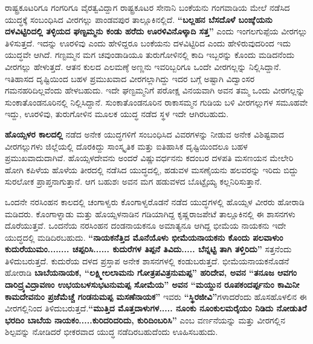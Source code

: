 ರಾಷ್ಟ್ರಕೂಟರಿಗೂ ಗಂಗರಿಗೂ ವೈರತ್ವವಿದ್ದಾಗ ರಾಷ್ಟ್ರಕೂಟರ ಸೇನಾನಿ ಬಂಕೆಯನು ಗಂಗವಾಡಿಯ ಮೇಲೆ ನಡೆಸಿದ ಯುದ್ಧಕ್ಕೆ ಸಂಬಂಧಿಸಿದ ವೀರಗಲ್ಲು ಪಾಂಡವಪುರ ತಾಲ್ಲೂಕಿನಲ್ಲಿದೆ. \textbf{“ಬಲ್ಲಹನ ಬೆಸದೊಳೆ ಬಂಙ್ಕೆಯನು ದಳವಿಟ್ಟಿರಿದಲ್ಲಿ ತಳ್ಳಿಯದ ಘಣ್ಟಮ್ಮನು ಕಂಡು ಹರೆದು ಊರಳಿವಿನೊಳ್ಕಾದಿ ಸತ್ತ”} ಎಂದು ಇಂಗಲಗುಪ್ಪೆಯ ವೀರಗಲ್ಲು ತಿಳಿಸುತ್ತದೆ. ಇದನ್ನು ಊರಳಿವು ಎಂದು ಹೇಳಿದ್ದರೂ ಬಂಕೆಯನು ದಳವಿಟ್ಟಿರಿದ ಎಂದು ಹೇಳಿರುವುದರಿಂದ ಇದು ಯುದ್ಧವೇ ಆಗಿದೆ. ಗಣ್ಟಮ್ಮನ ಮಗ ಚವುಂಡಾಡಿಯೂ ತುರುಗೋಳಿನಲ್ಲಿ ಕಾದಿ ಇಬ್ಬರನ್ನು ಕೊಂದು ಮಡಿದನೆಂದು ವೀರಗಲ್ಲು ಹೇಳುತ್ತದೆ. ಆತನ ಕುಲದ ಎಲಮಣ್ಠೆ ಅಣ್ಣನು ಇವರಿಬ್ಬರಿಗೂ ಒಂದೇ ವೀರಗಲ್ಲನ್ನು ನಿಲ್ಲಿಸಿದ್ದಾನೆ. ಇತಿಹಾಸದ ದೃಷ್ಟಿಯಿಂದ ಬಹಳ ಪ್ರಮುಖವಾದ ವೀರಗಲ್ಲಾಗಿದ್ದು ಇದರ ಬಗ್ಗೆ ಅಷ್ಟಾಗಿ ವಿದ್ವಾಂಸರ ಗಮನಹರಿದಿಲ್ಲವೆಂದು ಹೇಳಬಹುದು. ಇದೇ ಘಣ್ಟಮ್ಮನಿಗೆ ಪರೋಕ್ಷ ವಿನಯವಾಗಿ ಅವನ ತಮ್ಮ ಒಂದು ವೀರಗಲ್ಲನ್ನು ಸುಂಕಾತೊಂಡನೂರಿನಲ್ಲಿ ನಿಲ್ಲಿಸಿದ್ದಾನೆ. ಸುಂಕಾತೊಂಡನೂರಿನ ರಾಕಾಸಮ್ಮನ ಗುಡಿಯ ಬಳಿ ವೀರಗಲ್ಲುಗಳ ಸಮೂಹವೇ ಇದ್ದು, ಊರಳಿವು, ತುರುಗೋಳಿನ ಮೂಲಕ ಯುದ್ಧ ನಡೆದ ಸ್ಥಳ ಇದೇ ಆಗಿರಬಹುದು.

\textbf{ಹೊಯ್ಸಳರ ಕಾಲದಲ್ಲಿ} ನಡೆದ ಅನೇಕ ಯುದ್ಧಗಳಿಗೆ ಸಂಬಂಧಿಸಿದ ವಿವರಗಳನ್ನು ನೀಡುವ ಅನೇಕ ವಿಶಿಷ್ಟವಾದ ವೀರಗಲ್ಲುಗಳು ಜಿಲ್ಲೆಯಲ್ಲಿ ದೊರಕಿದ್ದು ಸಾಂಸ್ಕೃತಿಕ ಮತ್ತು ಐತಿಹಾಸಿಕ ದೃಷ್ಟಿಯಿಂದಲೂ ಬಹಳ ಪ್ರಮುಖವಾದುದಾಗಿವೆ. ಹೊಯ್ಸಳದೇವನು ಅಂದರೆ ವಿಷ್ಣುವರ್ಧನನು ಕದಂಬರ ದಳಪತಿ ಮಸಣಯನ ಮೇಲೇರಿ ಹೋಗಿ ಕಪಿಳೆಯ ಹೊಳೆಯ ತೀರದಲ್ಲಿ ನಡೆಸಿದ ಯುದ್ಧದಲ್ಲಿ, ಹಡುವಳ ಮಸಣೈಯನು ಹಲವರನ್ನು ಇರಿದು ಬಿದ್ದು ಸುರಲೋಕ ಪ್ರಾಪ್ತನಾಗುತ್ತಾನೆ. ಆಗ ಬಹುಶಃ ಅವನ ಮಗ ಹಡುವಳದ ಬೊಟ್ಟೈಯ್ಯ ಕಲ್ಲನಿರಿಸುತ್ತಾನೆ.

ಒಂದನೇ ನರಸಿಂಹನ ಕಾಲದಲ್ಲಿ ಚಂಗಾಳ್ವರು ಕೊಂಗಾಳ್ವರೊಡನೆ ನಡೆದ ಯುದ್ಧಗಳಲ್ಲಿ ಹೊಯ್ಸಳ ವೀರರು ಹೋರಾಡಿ ಮಡಿದರು. ಕೊಂಗಾಳ್ನಾಡು ಮತ್ತು ಹೊಯ್ಸಳನಾಡಿನ ಗಡಿಯಾಗಿದ್ದ ಕೃಷ್ಣರಾಜಪೇಟೆ ತಾಲ್ಲೂಕಿನಲ್ಲಿ ಈ ಶಾಸನಗಳು ದೊರೆಯುತ್ತವೆ. ಒಂದನೆಯ ನರಸಿಂಹನ ದಂಡನಾಯಕನೂ ಅಮಾತ್ಯನೂ ಆಗಿದ್ದ ಭೀಮೆಯ ನಾಯಕನು ಇದೇ ಯುದ್ಧದಲ್ಲಿ ಮಡಿದಿರಬಹುದು. \textbf{“ನಾಯಕನೆತ್ತಿದ ಮೊನೆಯೊಳು ಭೀಮೆಯನಾಯಕನು ಕೊಂದು ಪಲವಾಳುಂ ಕುದುರೆಯುಮಂ........ ಚಪ್ಪರಿಸಿ...... ಕುದುರೆಗಳ ತಿಪ್ಪನೆ ತಿವಿದು..... ಬೆನ್ನಟ್ಟಿ ತಾಗಿ ತಳ್ತಿರಿದು”} ಸತ್ತನೆಂದು ತಿಳಿದುಬರುತ್ತದೆ. ಕುದುರೆಯ ದಳದ ಪ್ರಸ್ತಾಪ ಅನೇಕ ಶಾಸನಗಳಲ್ಲಿ ಕಂಡುಬರುತ್ತದೆ. ಭೀಮೆಯನಾಯಕನೊಡನೆ ಹೋರಾಡಿ \textbf{ಬಾಬೆಯನಾಯಕ, “ಲಕ್ಷ್ಮೀಲಲಾಮನು ಗೋತ್ರಪವಿತ್ರನುಮಪ್ಪ” ಹರಿದೇವ, ಅವನ “ತನೂಜ ಆವಗಂ ದಾರಿದ್ರ್ಯವಿದ್ರಾವಣಂ ಉಭಯಬಳ\break ಸುಭಟನುಮಪ್ಪ ಸೋಮೆಯ” ಅವನ “ಮಯ್ದುನ ರೂಪಕಂದರ್ಪ್ಪನುಂ ಕಾಮಿನೀ ಕಾಮದೇವನುಂ ಪ್ರಜೆಮೆಚ್ಚೆ ಗಂಡನು\-ಮಪ್ಪ ಮಸಣೆನಾಯಕ”} ಇವರು \textbf{“ಸ್ಥಿರಜೀವಿ”}ಗಳಾದರೆಂದು ಹೊಸಹೊಳಲಿನ ಈ ವೀರಗಲ್ಲಿನಿಂದ ತಿಳಿದು\-ಬರುತ್ತದೆ.\textbf{“ಮುತ್ತಿದ ಮೊತ್ತದಾಳುಗಳ..... ನೂಂಕು ನೂಂಕುಲಮರೈಯಂ ನಿಡಿದು ನೋಡುತಿರೆ ಭರದಿಂ ಬಾಬೆಯ ನಾಯಕಂ.....ಕುರಿದರಿದರಿದು, ಕುರಿದಿಂಬರಿಸಿ”} ಎಂಬ ವರ್ಣನೆಯನ್ನು ಮತ್ತು ವೀರಗಲ್ಲಿನ ಶಿಲ್ಪವನ್ನು ನೋಡಿದರೆ ಭೀಕರವಾದ ಯುದ್ಧ ನಡೆದಿರಬಹುದೆಂದು ಊಹಿಸಬಹುದು.

